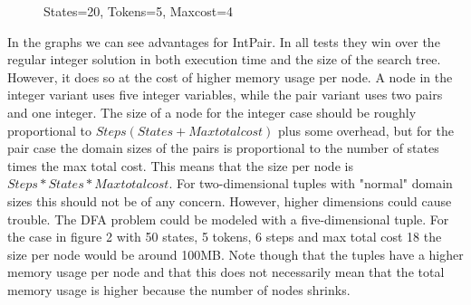\documentclass[a4paper,11pt]{article}
\begin{document}
\begin{figure}[H]
\caption{{States=20, Tokens=5, Maxcost=4}}
\end{figure}

In the graphs we can see advantages for IntPair. In all tests they win over the regular integer solution in both execution time and the size of the search tree. However, it does so at the cost of higher memory usage per node. A node in the integer variant uses five integer variables, while the pair variant uses two pairs and one integer. The size of a node for the integer case should be roughly proportional to $Steps(States + Maxtotalcost)$ plus some overhead, but for the pair case the domain sizes of the pairs is proportional to the number of states times the max total cost. This means that the size per node is $Steps*States*Maxtotalcost$. For two-dimensional tuples with "normal" domain sizes this should not be of any concern. However, higher dimensions could cause trouble. The DFA problem could be modeled with a five-dimensional tuple. For the case in figure 2 with 50 states, 5 tokens, 6 steps and max total cost 18 the size per node would be around 100MB. Note though that the tuples have a higher memory usage per node and that this does not necessarily mean that the total memory usage is higher because the number of nodes shrinks.
\end{document}
